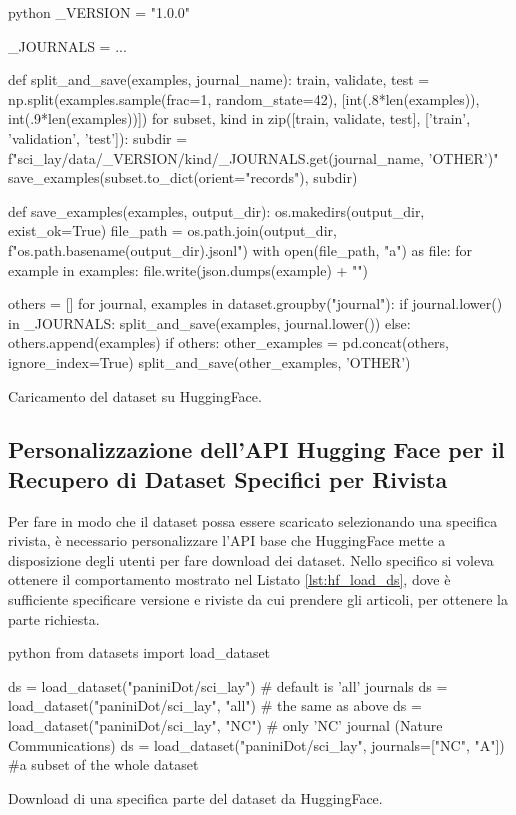 \documentclass[12pt,a4paper,twoside,openright]{book}
\begin{document}
\begin{customcode}
\begin{mintedbox}{python}
_VERSION = "1.0.0"

_JOURNALS = { ... }  

def split_and_save(examples, journal_name):
    train, validate, test = np.split(examples.sample(frac=1, random_state=42), 
                                     [int(.8*len(examples)), int(.9*len(examples))])
    for subset, kind in zip([train, validate, test], ['train', 'validation', 'test']):
        subdir = f"sci_lay/data/{_VERSION}/{kind}/{_JOURNALS.get(journal_name, 'OTHER')}"
        save_examples(subset.to_dict(orient="records"), subdir)

def save_examples(examples, output_dir):
    os.makedirs(output_dir, exist_ok=True)
    file_path = os.path.join(output_dir, f"{os.path.basename(output_dir)}.jsonl")
    with open(file_path, "a") as file:
        for example in examples:
            file.write(json.dumps(example) + "\n")

others = []
for journal, examples in dataset.groupby("journal"):
    if journal.lower() in _JOURNALS:
        split_and_save(examples, journal.lower())
    else:
        others.append(examples)
if others:
    other_examples = pd.concat(others, ignore_index=True)
    split_and_save(other_examples, 'OTHER')
\end{mintedbox}
\caption{Caricamento del dataset su HuggingFace.}
\label{lst:py_upload_hf}
\end{customcode}

\subsection{Personalizzazione dell'API Hugging Face per il Recupero di Dataset Specifici per Rivista}
Per fare in modo che il dataset possa essere scaricato selezionando una specifica rivista, è necessario personalizzare l'API base che HuggingFace mette a disposizione degli utenti per fare download dei dataset. Nello specifico si voleva ottenere il comportamento mostrato nel Listato \ref{lst:hf_load_ds}, dove è sufficiente specificare versione e riviste da cui prendere gli articoli, per ottenere la parte richiesta.

\begin{customcode}
\begin{mintedbox}{python}
from datasets import load_dataset

ds = load_dataset("paniniDot/sci_lay")  # default is 'all' journals
ds = load_dataset("paniniDot/sci_lay", "all")  # the same as above
ds = load_dataset("paniniDot/sci_lay", "NC")  # only 'NC' journal (Nature Communications)
ds = load_dataset("paniniDot/sci_lay", journals=["NC", "A"]) #a subset of the whole dataset
\end{mintedbox}
\caption{Download di una specifica parte del dataset da HuggingFace.}
\label{lst:hf_load_ds}
\end{customcode}
\end{document}

